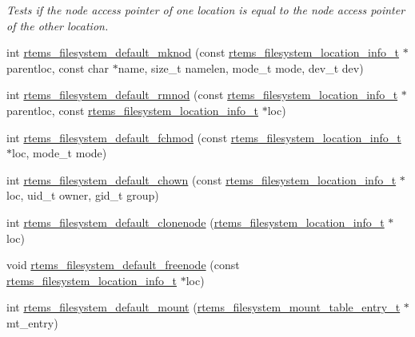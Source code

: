 \begin{DoxyCompactItemize}
\begin{DoxyCompactList}\small\item\em Tests if the node access pointer of one location is equal to the node access pointer of the other location. \end{DoxyCompactList}\item 
int \mbox{\hyperlink{group__LibIOFSOps_ga2fe9c4e63942b2ebd92b0e1a3a089bcc}{rtems\+\_\+filesystem\+\_\+default\+\_\+mknod}} (const \mbox{\hyperlink{group__LibIO_ga3252b3d31ee3c49ffff0b7604a676864}{rtems\+\_\+filesystem\+\_\+location\+\_\+info\+\_\+t}} $\ast$parentloc, const char $\ast$name, size\+\_\+t namelen, mode\+\_\+t mode, dev\+\_\+t dev)
\item 
int \mbox{\hyperlink{group__LibIOFSOps_ga63601e9ffafa64ffa19065810db9d95c}{rtems\+\_\+filesystem\+\_\+default\+\_\+rmnod}} (const \mbox{\hyperlink{group__LibIO_ga3252b3d31ee3c49ffff0b7604a676864}{rtems\+\_\+filesystem\+\_\+location\+\_\+info\+\_\+t}} $\ast$parentloc, const \mbox{\hyperlink{group__LibIO_ga3252b3d31ee3c49ffff0b7604a676864}{rtems\+\_\+filesystem\+\_\+location\+\_\+info\+\_\+t}} $\ast$loc)
\item 
int \mbox{\hyperlink{group__LibIOFSOps_ga3dd804eb9c4578e02e07eb0ee445af43}{rtems\+\_\+filesystem\+\_\+default\+\_\+fchmod}} (const \mbox{\hyperlink{group__LibIO_ga3252b3d31ee3c49ffff0b7604a676864}{rtems\+\_\+filesystem\+\_\+location\+\_\+info\+\_\+t}} $\ast$loc, mode\+\_\+t mode)
\item 
int \mbox{\hyperlink{group__LibIOFSOps_gae95fe9ae3c0b953cc789a3885a9fe20b}{rtems\+\_\+filesystem\+\_\+default\+\_\+chown}} (const \mbox{\hyperlink{group__LibIO_ga3252b3d31ee3c49ffff0b7604a676864}{rtems\+\_\+filesystem\+\_\+location\+\_\+info\+\_\+t}} $\ast$loc, uid\+\_\+t owner, gid\+\_\+t group)
\item 
int \mbox{\hyperlink{group__LibIOFSOps_ga50dd6f2187a5ce3f918b18548df6e9eb}{rtems\+\_\+filesystem\+\_\+default\+\_\+clonenode}} (\mbox{\hyperlink{group__LibIO_ga3252b3d31ee3c49ffff0b7604a676864}{rtems\+\_\+filesystem\+\_\+location\+\_\+info\+\_\+t}} $\ast$loc)
\item 
void \mbox{\hyperlink{group__LibIOFSOps_ga801a36a04179ec2431409303fa1b9031}{rtems\+\_\+filesystem\+\_\+default\+\_\+freenode}} (const \mbox{\hyperlink{group__LibIO_ga3252b3d31ee3c49ffff0b7604a676864}{rtems\+\_\+filesystem\+\_\+location\+\_\+info\+\_\+t}} $\ast$loc)
\item 
int \mbox{\hyperlink{group__LibIOFSOps_ga6c134a7f03171ac182a6430be97b1cef}{rtems\+\_\+filesystem\+\_\+default\+\_\+mount}} (\mbox{\hyperlink{structrtems__filesystem__mount__table__entry__tt}{rtems\+\_\+filesystem\+\_\+mount\+\_\+table\+\_\+entry\+\_\+t}} $\ast$mt\+\_\+entry)

\end{DoxyCompactItemize}
